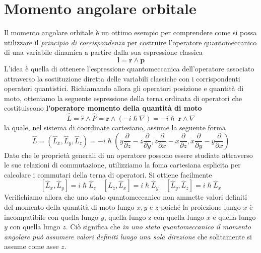 \section{Momento angolare orbitale}\label{sec:momento-angolare-orbitale}

Il momento angolare orbitale è un ottimo esempio per comprendere come si
possa utilizzare il \emph{principio di corrispondenza} per costruire
l'operatore quantomeccanico di una variabile dinamica a partire dalla
sua espressione classica
\[
    \bm{l}  = \bm{r} \wedge \bm{p}
\]
L'idea è quella di ottenere l'espressione quantomeccanica
dell'operatore associato attraverso la sostituzione diretta delle
variabili classiche con i corrispondenti operatori quantistici.
Richiamando allora gli operatori posizione e quantità di moto, otteniamo
la seguente espressione della terna ordinata di operatori che
costituiscono \textbf{l'operatore momento della quantità di moto}
\[
    \hat{L} = \hat{r} \wedge \hat{P}=\bm{r} \wedge (- i \hslash \nabla) = - i \hslash \ \bm{r} \wedge \nabla
\]
la quale, nel sistema di coordinate cartesiano, assume la seguente forma
\[
    \hat{L} = (\hat{L}_{x}, \hat{L}_{y}, \hat{L}_{z}) = - i \hslash \left( y \frac{\partial}{\partial z} - z \frac{\partial}{\partial y},z \frac{\partial}{\partial x}-x \frac{\partial}{\partial z}, x \frac{\partial}{\partial y} - y \frac{\partial}{\partial x} \right)
\] Dato che le proprietà generali di un operatore possono essere
studiate attraverso le sue relazioni di commutazione, utilizziamo la
foma cartesiana esplicita per calcolare i commutari della terna di
operatori.
Si ottiene facilmente
\[
    [\hat{L}_{x},\hat{L}_{y}] = i \hslash  \hat{L}_{z} \quad
    [\hat{L}_{z},\hat{L}_{x}] = i \hslash  \hat{L}_{y} \quad
    [\hat{L}_{y},\hat{L}_{z}] = i \hslash  \hat{L}_{x}
\]
Verifichiamo allora che uno stato quantomeccanico non ammette valori
definiti del momento della quantità di moto lungo \(x, y\) e \(z\)
poiché la proiezione lungo \(x\) è incompatibile con quella lungo \(y\),
quella lungo z con quella lungo \(x\) e quella lungo \(y\) con quella
lungo \(z\).
Ciò significa che \emph{in uno stato quantomeccanico il
momento angolare può assumere valori definiti lungo una sola direzione}
che solitamente si assume come asse \(z\).

